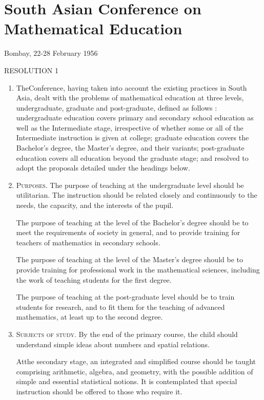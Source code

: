 \chapter{South Asian Conference on Mathematical Education}

\begin{center}
Bombay, 22-28 February 1956
\smallskip

RESOLUTION 1
\end{center}
\medskip

\setcounter{pageoriginal}{168}
\begin{enumerate}
\item The\pageoriginale Conference, having taken into account the existing practices in South Asia, dealt with the problems of mathematical education at three levels, undergraduate, graduate and post-graduate, defined as follows : undergraduate education covers primary and secondary school education as well as the Intermediate stage, irrespective of whether some or all of the Intermediate instruction is given at college; graduate education covers the Bachelor's degree, the Master's degree, and their variants; post-graduate education covers all education beyond the graduate stage; and resolved to adopt the proposals detailed under the headings below.

\item \textsc{Purposes.} The purpose of teaching at the undergraduate level should be utilitarian. The instruction should be related closely and continuously to the needs, the capacity, and the interests of the pupil.

The purpose of teaching at the level of the Bachelor's degree should be to meet the requirements of society in general, and to provide training for teachers of mathematics in secondary schools.

The purpose of teaching at the level of the Master's degree should be to provide training for professional work in the mathematical sciences, including the work of teaching students for the first degree. 

The purpose of teaching at the post-graduate level should be to train students for research, and to fit them for the teaching of advanced mathematics, at least up to the second degree.

\item \textsc{Subjects of study.} By the end of the primary course, the child should understand simple ideas about numbers and spatial relations.


At\pageoriginale the secondary stage, an integrated and simplified course should be taught comprising arithmetic, algebra, and geometry, with the possible addition of simple and essential statistical notions. It is contemplated that special instruction should be offered to those who require it.


\end{enumerate}

